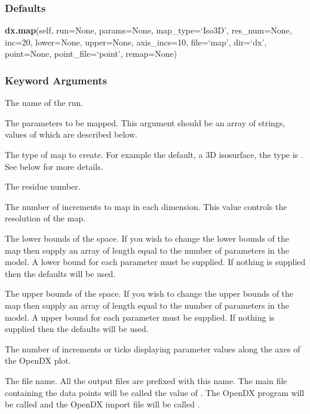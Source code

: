 \subsubsection{Defaults}

\textsf{\textbf{dx.map}(self, run=None, params=None, map\_type=`Iso3D', res\_num=None, inc=20, lower=None, upper=None, axis\_incs=10, file=`map', dir=`dx', point=None, point\_file=`point', remap=None)}


\subsubsection{Keyword Arguments}

  The name of the run. 

  The parameters to be mapped.  This argument should be an array of strings, values of which are described below. 

  The type of map to create.  For example the default, a 3D isosurface, the type is .  See below for more details. 

  The residue number. 

  The number of increments to map in each dimension.  This value controls the resolution of the map. 

  The lower bounds of the space.  If you wish to change the lower bounds of the map then supply an array of length equal to the number of parameters in the model.  A lower bound for each parameter must be supplied.  If nothing is supplied then the defaults will be used. 

  The upper bounds of the space.  If you wish to change the upper bounds of the map then supply an array of length equal to the number of parameters in the model.  A upper bound for each parameter must be supplied.  If nothing is supplied then the defaults will be used. 

  The number of increments or ticks displaying parameter values along the axes of the OpenDX plot. 

  The file name.  All the output files are prefixed with this name.  The main file containing the data points will be called the value of .  The OpenDX program will be called  and the OpenDX import file will be called . 

